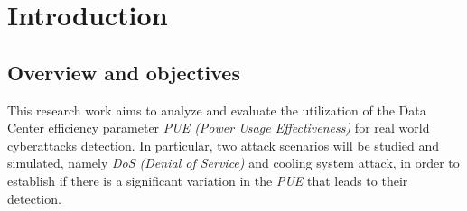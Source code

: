 \chapter{Introduction} \label{chapter:introduction}

\begin{citazione}

\end{citazione}
\newpage

\section{Overview and objectives} 
This research work aims to analyze and evaluate the utilization of the Data Center efficiency parameter \emph{PUE (Power Usage Effectiveness)} for real world cyberattacks detection. In particular, two attack scenarios will be studied and simulated, namely \emph{DoS (Denial of Service)} and cooling system attack, in order to establish if there is a significant variation in the \emph{PUE} that leads to their detection. 


